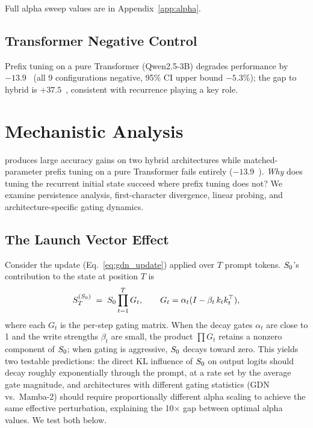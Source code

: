 \documentclass{article}
\begin{document}
Full alpha sweep values are in Appendix~\ref{app:alpha}.

\subsection{Transformer Negative Control}
\label{sec:results_transformer}

Prefix tuning on a pure Transformer (Qwen2.5-3B) degrades performance by $-13.9$~\pp{} (all 9 configurations negative, 95\% CI upper bound $-5.3$\%); the gap to hybrid \methodshort is $+37.5$~\pp, consistent with recurrence playing a key role.

\section{Mechanistic Analysis}
\label{sec:mechanistic}

\method produces large accuracy gains on two hybrid architectures while
matched-parameter prefix tuning on a pure Transformer fails entirely
($-13.9$~\pp). \emph{Why} does tuning the recurrent initial state succeed
where prefix tuning does not? We examine persistence analysis, first-character divergence, linear probing,
and architecture-specific gating dynamics.

\subsection{The Launch Vector Effect}
\label{sec:mech_launch}

Consider the \gdn update (Eq.~\ref{eq:gdn_update}) applied over $T$ prompt
tokens. $S_0$'s contribution to the state at position $T$ is
\begin{equation}
  S_T^{(S_0)} \;=\; S_0 \prod_{t=1}^{T} G_t,
  \qquad G_t = \alpha_t (I - \beta_t\, k_t k_t^\top),
  \label{eq:decay}
\end{equation}
where each $G_t$ is the per-step gating matrix. When the decay gates
$\alpha_t$ are close to 1 and the write strengths $\beta_t$ are small, the
product $\prod G_t$ retains a nonzero component of $S_0$; when gating is
aggressive, $S_0$ decays toward zero. This yields two testable predictions: the direct KL influence of $S_0$ on output logits should
decay roughly exponentially through the prompt, at a rate set by the average
gate magnitude, and architectures with different gating statistics
(GDN vs.\ Mamba-2) should require proportionally different alpha scaling to
achieve the same effective perturbation, explaining the 10$\times$ gap
between optimal alpha values. We test both below.
\end{document}
